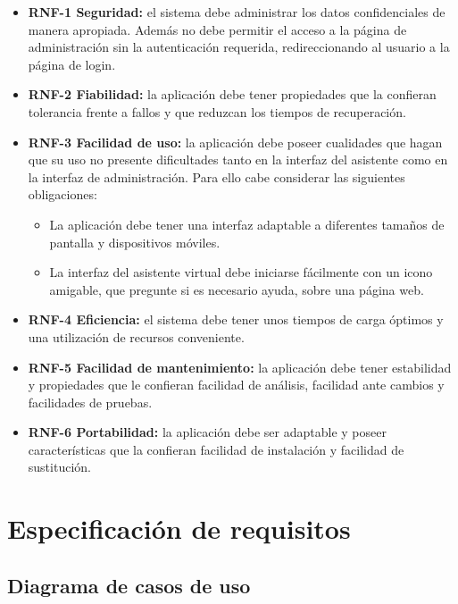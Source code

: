 \begin{itemize}
\tightlist

\item
\textbf{RNF-1 Seguridad:} el sistema debe administrar los datos confidenciales de manera apropiada. Además no debe permitir el acceso a la página de administración sin la autenticación requerida, redireccionando al usuario a la página de login.

\item
\textbf{RNF-2 Fiabilidad:} la aplicación debe tener propiedades que la confieran tolerancia frente a fallos y que reduzcan los tiempos de recuperación.

\item
\textbf{RNF-3 Facilidad de uso:} la aplicación debe poseer cualidades que hagan que su uso no presente dificultades tanto en la interfaz del asistente como en la interfaz de administración. Para ello cabe considerar las siguientes obligaciones:
	\begin{itemize}
	\tightlist
	\item
	La aplicación debe tener una interfaz adaptable a diferentes tamaños de pantalla y dispositivos móviles.
	\item
	La interfaz del asistente virtual debe iniciarse fácilmente con un icono amigable, que pregunte si es necesario ayuda, sobre una página web.
	\end{itemize}

\item
\textbf{RNF-4 Eficiencia:} el sistema debe tener unos tiempos de carga óptimos y una utilización de recursos conveniente.

\item
\textbf{RNF-5 Facilidad de mantenimiento:} la aplicación debe tener estabilidad y propiedades que le confieran facilidad de análisis, facilidad ante cambios y facilidades de pruebas.

\item
\textbf{RNF-6 Portabilidad:} la aplicación debe ser adaptable y poseer características que la confieran facilidad de instalación y facilidad de sustitución.

\end{itemize}

\newpage
\section{Especificación de requisitos}

\subsection{Diagrama de casos de uso}

